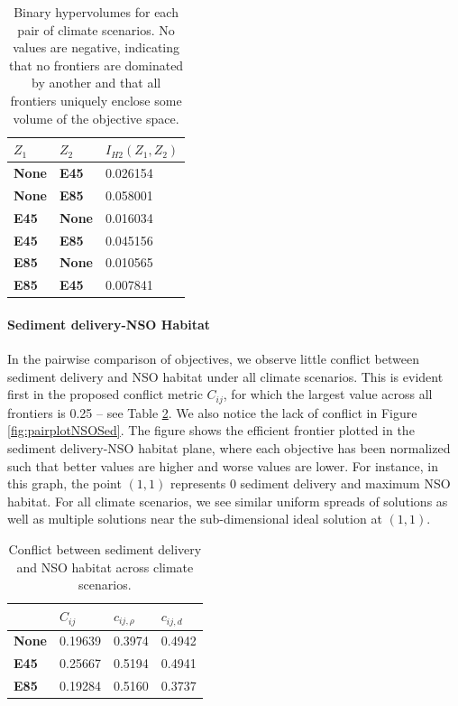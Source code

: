 \begin{table}[]
\centering
\caption[Binary hypervolume values for each pair of climate scenarios]{Binary hypervolumes for each pair of climate scenarios. No values are negative, indicating that no frontiers are dominated by another and that all frontiers uniquely enclose some volume of the objective space.}
\label{tab:binaryHypervols}
\begin{tabular}{ll|l}
\textbf{$Z_1$} & \textbf{$Z_2$} & \textbf{$I_{H2}(Z_1,Z_2)$} \\ \hline
\textbf{None}  & \textbf{E45}   & 0.026154                   \\
\textbf{None}  & \textbf{E85}   & 0.058001                   \\
\textbf{E45}   & \textbf{None}  & 0.016034                   \\
\textbf{E45}   & \textbf{E85}   & 0.045156                   \\
\textbf{E85}   & \textbf{None}  & 0.010565                   \\
\textbf{E85}   & \textbf{E45}   & 0.007841                  
\end{tabular}
\end{table}

\paragraph{Sediment delivery-NSO Habitat}
In the pairwise comparison of objectives, we observe little conflict between sediment delivery and NSO habitat under all climate scenarios. This is evident first in the proposed conflict metric $C_{ij}$, for which the largest value across all frontiers is 0.25 -- see Table \ref{tab:pairConflict-SedNSO}. We also notice the lack of conflict in Figure \ref{fig:pairplotNSOSed}. The figure shows the efficient frontier plotted in the sediment delivery-NSO habitat plane, where each objective has been normalized such that better values are higher and worse values are lower. For instance, in this graph, the point $(1,1)$ represents 0 sediment delivery and maximum NSO habitat. For all climate scenarios, we see similar uniform spreads of solutions as well as multiple solutions near the sub-dimensional ideal solution at $(1,1)$.

\begin{table}[]
\centering
\caption[Sediment-NSO conflict across climate scenarios]{Conflict between sediment delivery and NSO habitat across climate scenarios.}
\label{tab:pairConflict-SedNSO}
\begin{tabular}{l|l|ll}
\textbf{}     & \textbf{$C_{ij}$} & \textbf{$c_{ij,\rho}$} & \textbf{$c_{ij,d}$} \\ \hline
\textbf{None} & 0.19639           & 0.3974                 & 0.4942              \\
\textbf{E45}  & 0.25667           & 0.5194                 & 0.4941              \\
\textbf{E85}  & 0.19284           & 0.5160                 & 0.3737             
\end{tabular}
\end{table}



